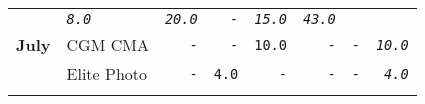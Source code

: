 \documentclass[11pt,A4paper,]{article}
\begin{document}
\begin{longtable}[]{@{}llrrrrrr@{}}
\begin{minipage}[t]{0.12\columnwidth}
\end{minipage} & \begin{minipage}[t]{0.12\columnwidth}\raggedleft\strut
\emph{\texttt{8.0}}\strut
\end{minipage} & \begin{minipage}[t]{0.12\columnwidth}\raggedleft\strut
\emph{\texttt{20.0}}\strut
\end{minipage} & \begin{minipage}[t]{0.12\columnwidth}\raggedleft\strut
\emph{\texttt{-}}\strut
\end{minipage} & \begin{minipage}[t]{0.12\columnwidth}\raggedleft\strut
\emph{\texttt{15.0}}\strut
\end{minipage} & \begin{minipage}[t]{0.12\columnwidth}\raggedleft\strut
\emph{\texttt{43.0}}\strut
\end{minipage}\tabularnewline
\textbf{July} & CGM CMA & \texttt{-} & \texttt{-} & \texttt{10.0} &
\texttt{-} & \texttt{-} & \emph{\texttt{10.0}}\tabularnewline
\begin{minipage}[t]{0.12\columnwidth}\raggedright\strut
\strut
\end{minipage} & \begin{minipage}[t]{0.12\columnwidth}\raggedright\strut
Elite Photo\strut
\end{minipage} & \begin{minipage}[t]{0.12\columnwidth}\raggedleft\strut
\texttt{-}\strut
\end{minipage} & \begin{minipage}[t]{0.12\columnwidth}\raggedleft\strut
\texttt{4.0}\strut
\end{minipage} & \begin{minipage}[t]{0.12\columnwidth}\raggedleft\strut
\texttt{-}\strut
\end{minipage} & \begin{minipage}[t]{0.12\columnwidth}\raggedleft\strut
\texttt{-}\strut
\end{minipage} & \begin{minipage}[t]{0.12\columnwidth}\raggedleft\strut
\texttt{-}\strut
\end{minipage} & \begin{minipage}[t]{0.12\columnwidth}\raggedleft\strut
\emph{\texttt{4.0}}\strut
\end{minipage}\tabularnewline
\begin{minipage}[t]{0.12\columnwidth}\raggedright\strut
\strut
\end{minipage} & \begin{minipage}[t]{0.12\columnwidth}\raggedright\strut

\end{minipage}
\end{longtable}
\end{document}
